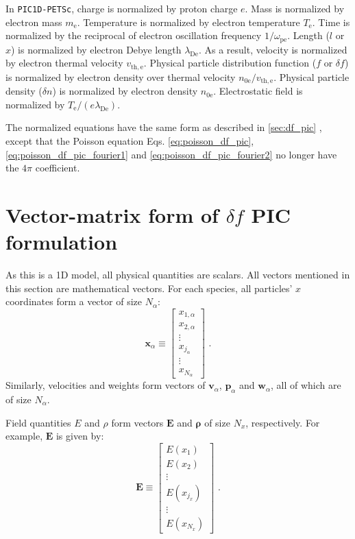 \documentclass[12pt]{article}
\let\orgautoref\autoref
\renewcommand{\autoref}[1]
{%
    \def\equationautorefname{Eq.}%
    \def\figureautorefname{Fig.}%
    \def\subfigureautorefname{Fig.}%
    \def\sectionautorefname{Sec.}%
    \def\subsubsectionautorefname{Sec.}%
    \orgautoref{#1}%
}
\begin{document}
In \texttt{PIC1D-PETSc}, charge is normalized by proton charge $e$.
Mass is normalized by electron mass $m_{\mathrm{e}}$.
Temperature is normalized by electron temperature $T_{\mathrm{e}}$.
Time is normalized by the reciprocal of electron oscillation frequency $1/\omega_{\mathrm{pe}}$.
Length ($l$ or $x$) is normalized by electron Debye length $\lambda_{\mathrm{De}}$.
As a result, velocity is normalized by electron thermal velocity $v_{\mathrm{th},\mathrm{e}}$.
Physical particle distribution function ($f$ or $\delta f$) is normalized by electron density over thermal velocity $n_{0 \mathrm{e}} / v_{\mathrm{th},\mathrm{e}}$.
Physical particle density ($\delta n$) is normalized by electron density $n_{0 \mathrm{e}}$.
Electrostatic field is normalized by $T_{\mathrm{e}} / (e \lambda_{\mathrm{De}})$.

The normalized equations have the same form as described in \autoref{sec:df_pic}, except that the Poisson equation Eqs. \ref{eq:poisson_df_pic}, \ref{eq:poisson_df_pic_fourier1} and \ref{eq:poisson_df_pic_fourier2} no longer have the $4 \pi$ coefficient.


\section{Vector-matrix form of $\delta f$ PIC formulation}

As this is a 1D model, all physical quantities are scalars.
All vectors mentioned in this section are mathematical vectors.
For each species, all particles' $x$ coordinates form a vector of size $N_\alpha$:
\begin{equation}
	\boldsymbol{x}_\alpha \equiv \left[ \begin{array}{c}
		x_{1,\alpha} \\
		x_{2,\alpha} \\
		\vdots \\
		x_{j_\alpha} \\
		\vdots \\
		x_{N_\alpha}
	\end{array} \right] \textrm{ .}
\end{equation}
Similarly, velocities and weights form vectors of $\boldsymbol{v}_\alpha$, $\boldsymbol{p}_\alpha$ and $\boldsymbol{w}_\alpha$, all of which are of size $N_\alpha$.

Field quantities $E$ and $\rho$ form vectors $\boldsymbol{E}$ and $\boldsymbol{\rho}$ of size $N_x$, respectively.
For example, $\boldsymbol{E}$ is given by:
\begin{equation}
	\boldsymbol{E} \equiv \left[ \begin{array}{c}
		E(x_{1}) \\
		E(x_{2}) \\
		\vdots \\
		E(x_{j_x}) \\
		\vdots \\
		E(x_{N_x})
	\end{array} \right] \textrm{ .}
\end{equation}
\end{document}
